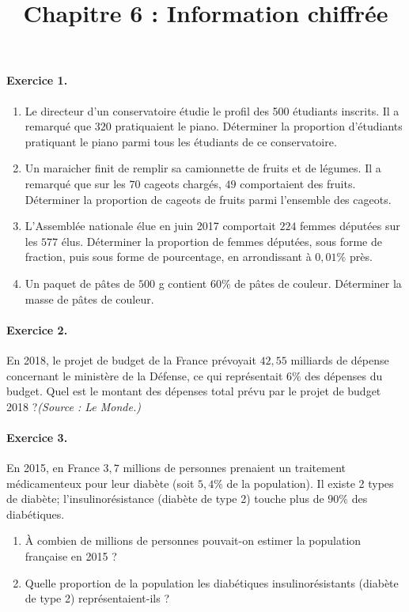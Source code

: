 \documentclass[11pt]{article}
\title{Chapitre 6 : Information chiffrée}
\date{}
\author{}
\begin{document}
\paragraph{Exercice 1.}
\begin{enumerate}
  \item Le directeur d’un conservatoire étudie le profil des 500 étudiants
    inscrits. Il a remarqué que $320$ pratiquaient le piano. Déterminer la
    proportion d’étudiants pratiquant le piano parmi tous les étudiants de ce
    conservatoire.
  \item Un maraicher finit de remplir sa camionnette de fruits et de légumes. Il
    a remarqué que sur les $70$ cageots chargés, $49$ comportaient des fruits.
    Déterminer la proportion de cageots de fruits parmi l’ensemble des cageots.
  \item L’Assemblée nationale élue en juin 2017 comportait $224$ femmes députées
    sur les $577$ élus. Déterminer la proportion de femmes députées, sous forme
    de fraction, puis sous forme de pourcentage, en arrondissant à $0,01\%$ près.
  \item Un paquet de pâtes de $500$ g contient $60\%$ de pâtes de
    couleur. Déterminer la masse de pâtes de couleur.
\end{enumerate}

\paragraph{Exercice 2.} En 2018, le projet de budget de la France prévoyait
$42,55$ milliards de dépense concernant le ministère de la Défense, ce qui
représentait $6\%$ des dépenses du budget. Quel est le montant des dépenses
total prévu par le projet de budget 2018 ?\hfill\emph{(Source : Le Monde.)}

\paragraph{Exercice 3.} En 2015, en France $3,7$ millions de personnes prenaient
un traitement médicamenteux pour leur diabète (soit $5,4\%$ de la population).
Il existe 2 types de diabète; l’insulinorésistance (diabète de type 2) touche
plus de $90\%$ des diabétiques.
\begin{enumerate}
  \item À combien de millions de personnes pouvait-on estimer la population
    française en 2015 ?
  \item Quelle proportion de la population les diabétiques insulinorésistants
    (diabète de type 2) représentaient-ils ?
\end{enumerate}
\end{document}
